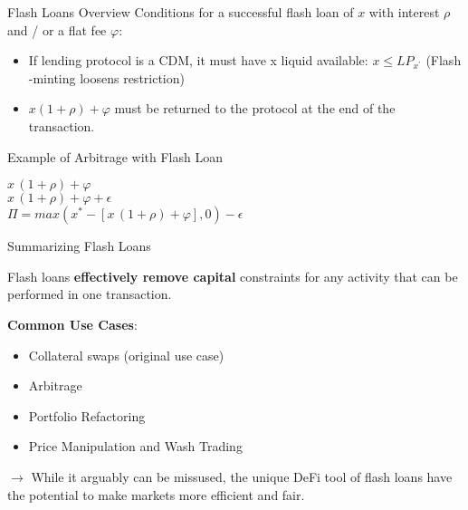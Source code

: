 \documentclass[handout]{beamer}
\begin{document}
\begin{frame}{Flash Loans Overview}
Conditions for a successful flash loan of $x$ with interest $\rho$  and / or a flat fee $\varphi$:

\vspace{1em}
\begin{itemize}
\item If lending protocol is a CDM, it must have x liquid available:  $x \leq LP_{x^{'}}$ (Flash -minting loosens restriction)


\item  $ x(1+\rho) + \varphi$ must be returned to the protocol at the end of the transaction.


\end{itemize}

	
\end{frame}


\begin{frame}{Example of Arbitrage with Flash Loan}

$ x\,(1+ \rho) + \varphi $
\\
$ x\,(1+ \rho) + \varphi+ \epsilon $ 
\\
$\Pi = max (x^{*}-[x \,(1+\rho) + \varphi ],0) - \epsilon$
	
\end{frame}


\begin{frame}{Summarizing Flash Loans}

Flash loans \textbf{effectively remove capital} constraints for any activity that can be performed in one transaction.

\vspace{1em}

\textbf{Common Use Cases}:

\begin{itemize}
\item Collateral swaps (original use case)
\item Arbitrage
\item Portfolio Refactoring
\item Price Manipulation and Wash Trading

\end{itemize}

\vspace{2em}

$\rightarrow$ While it arguably can be missused, the unique DeFi tool of flash loans have the potential to make markets more efficient and fair.


	
\end{frame}
\end{document}
